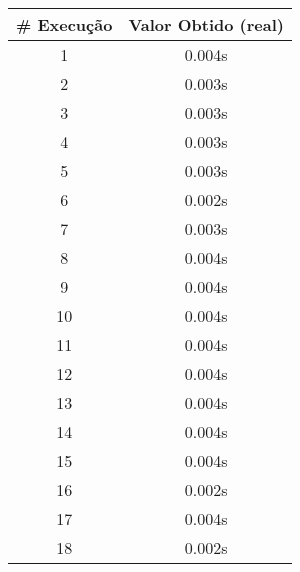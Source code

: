 \documentclass[11pt]{article}
\begin{document}
\begin{table}[!h]
\begin{center}
\begin{minipage}{0.48\textwidth}
\begin{tabular}{| c | c |}
				\textbf{\# Execução} &  \textbf{Valor Obtido (real)} \\ \hline
				1 & 0.004s \\ \hline
				2 & 0.003s \\ \hline
				3 & 0.003s \\ \hline
				4 & 0.003s \\ \hline
				5 & 0.003s \\ \hline
				6 & 0.002s \\ \hline
				7 & 0.003s \\ \hline
				8 & 0.004s \\ \hline
				9 & 0.004s \\ \hline
				10 & 0.004s \\ \hline
				11 & 0.004s \\ \hline
				12 & 0.004s \\ \hline
				13 & 0.004s \\ \hline
				14 & 0.004s \\ \hline
				15 & 0.004s \\ \hline
				16 & 0.002s \\ \hline
				17 & 0.004s \\ \hline
				18 & 0.002s \\ \hline
			\end{tabular}
		\end{minipage}
	\end{center}
\end{table}

\pagebreak
\end{document}
